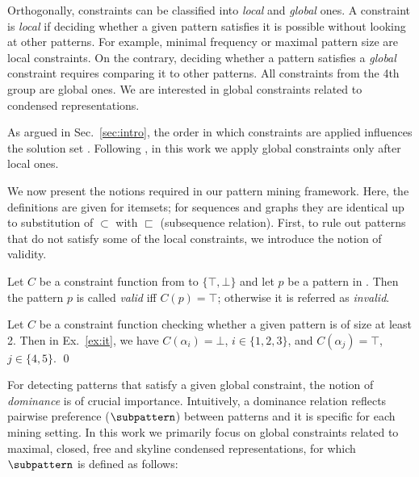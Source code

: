 Orthogonally, constraints can be classified into \emph{local} and \emph{global} ones.  
A constraint is \emph{local} if deciding whether a given pattern satisfies it is possible without looking at other patterns. For example, minimal frequency or maximal pattern %
size are local constraints. On the contrary, deciding whether a pattern satisfies a \emph{global} constraint requires comparing it to other patterns. All constraints from the 4th group are global ones. We are interested in global constraints related to condensed representations. 

As argued in Sec.~\ref{sec:intro}, the order in which constraints are applied influences the solution set \parencite{DBLP:journals/kais/BonchiL06}. %
Following \textcite{DBLP:journals/kais/BonchiL06}, in this work we %
apply %
global constraints only after local ones.

We now present the notions required in our pattern mining framework. Here, the definitions are given for itemsets; for sequences and graphs they are identical up to substitution of $\subset$ with $\sqsubset$ (subsequence relation). First, to rule out patterns that do not satisfy some of the local constraints, we introduce the notion of validity.

\begin{definition}\label{def:val}
    Let $C$ be a constraint function  from \patternspace to $\{ \top, \bot \}$ and let $p$ be a pattern in \patternspace. Then the pattern $p$ is called \emph{valid} iff $C(p) = \top$; otherwise it is referred  as \emph{invalid}.
\end{definition}


\begin{example}\label{ex:valid}
    Let $C$ be a constraint function checking whether a given pattern is of size %
    at least 2. Then in Ex.~\ref{ex:it}, we have $C(\alpha_i)=\bot$, $i\in\{1,2,3\}$, and $C(\alpha_j)=\top$, $j\in\{4,5\}$. \qed
\end{example}

For detecting patterns that satisfy a given global constraint, the notion of \emph{dominance} is of crucial importance. Intuitively, a dominance relation reflects pairwise preference ($\subpattern$)
between patterns and it is specific for each mining setting.  In this work we primarily focus on global constraints related to maximal, closed, free and skyline condensed representations, for which $\subpattern$ is defined as follows:

